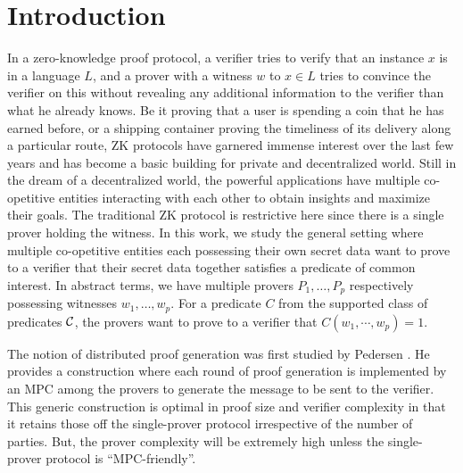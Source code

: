 \section{Introduction} \label{sec:intro}
In a zero-knowledge proof protocol, a verifier tries to verify that an instance $x$ is in a language $L$, and a prover with a witness $w$ to $x \in L$ tries to convince the verifier on this without revealing any additional information to the verifier than what he already knows. Be it proving that a user is spending a coin that he has earned before, or a shipping container proving the timeliness of its delivery along a particular route, ZK protocols have garnered immense interest over the last few years and has become a basic building for private and decentralized world. Still in the dream of a decentralized world, the powerful applications have multiple co-opetitive entities interacting with each other to obtain insights and maximize their goals. The traditional ZK protocol is restrictive here since there is a single prover holding the witness. In this work, we study the general setting where multiple co-opetitive entities each possessing their own secret data want to prove to a verifier that their secret data together satisfies a predicate of common interest. In abstract terms, we have multiple provers $P_1,\ldots,P_p$ respectively possessing witnesses $w_1, \ldots, w_p$. For a predicate $C$ from the supported class of predicates ${\cal C}$, the provers want to prove to a verifier that $C(w_1,\cdots,w_p) = 1$.

The notion of distributed proof generation was first studied by Pedersen \cite{PedThesis}.
He provides a construction where each round of proof generation is implemented by an MPC among the provers to generate the message to be sent to the verifier.
This generic construction is optimal in proof size and verifier complexity in that it retains those off the single-prover protocol irrespective of the number of parties. But, the prover complexity will be extremely high unless the single-prover protocol is ``MPC-friendly''. 

